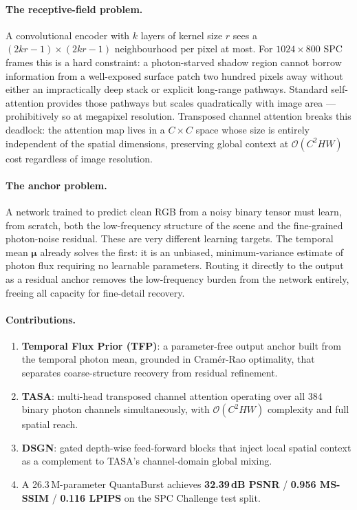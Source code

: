 \documentclass[10pt,twocolumn,letterpaper]{article}
\newcommand{\bmu}{\boldsymbol{\mu}}
\begin{document}
\paragraph{The receptive-field problem.}
A convolutional encoder with $k$ layers of kernel size $r$ sees a
$(2kr{-}1){\times}(2kr{-}1)$ neighbourhood per pixel at most.
For $1024{\times}800$ SPC frames this is a hard constraint:
a photon-starved shadow region cannot borrow information from a
well-exposed surface patch two hundred pixels away without either an
impractically deep stack or explicit long-range pathways.
Standard self-attention provides those pathways but scales
quadratically with image area --- prohibitively so at megapixel
resolution.  Transposed channel attention
\cite{zamir2022restormer} breaks this deadlock: the attention map
lives in a $C{\times}C$ space whose size is entirely independent of
the spatial dimensions, preserving global context at
$\mathcal{O}(C^2HW)$ cost regardless of image resolution.

\paragraph{The anchor problem.}
A network trained to predict clean RGB from a noisy binary tensor
must learn, from scratch, both the low-frequency structure of the
scene and the fine-grained photon-noise residual.
These are very different learning targets.
The temporal mean $\bmu$ already solves the first: it is an
unbiased, minimum-variance estimate of photon flux requiring no
learnable parameters.  Routing it directly to the output as a
residual anchor removes the low-frequency burden from the network
entirely, freeing all capacity for fine-detail recovery.

\paragraph{Contributions.}
\begin{enumerate}[nosep,leftmargin=1.5em]
  \item \textbf{Temporal Flux Prior (TFP)}: a parameter-free output
    anchor built from the temporal photon mean, grounded in
    Cram\'{e}r-Rao optimality, that separates coarse-structure
    recovery from residual refinement.
  \item \textbf{TASA}: multi-head transposed channel attention
    operating over all 384 binary photon channels simultaneously,
    with $\mathcal{O}(C^2HW)$ complexity and full spatial reach.
  \item \textbf{DSGN}: gated depth-wise feed-forward blocks that
    inject local spatial context as a complement to TASA's
    channel-domain global mixing.
  \item A 26.3\,M-parameter QuantaBurst achieves
    \textbf{32.39\,dB PSNR} / \textbf{0.956 MS-SSIM} /
    \textbf{0.116 LPIPS} on the SPC Challenge test split.
\end{enumerate}
\end{document}
